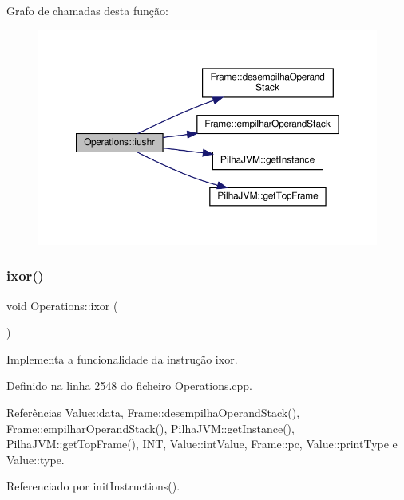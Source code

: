 Grafo de chamadas desta função\+:
\nopagebreak
\begin{figure}[H]
\begin{center}
\leavevmode
\includegraphics[width=350pt]{classOperations_ae3ab5ae36e587a47832886fdf4f8b2a6_cgraph}
\end{center}
\end{figure}
\mbox{\label{classOperations_abd0ce3453623b677de3af1f05bcf4b0b}} 
\subsubsection{\texorpdfstring{ixor()}{ixor()}}
{\footnotesize\ttfamily void Operations\+::ixor (\begin{DoxyParamCaption}{ }\end{DoxyParamCaption})\hspace{0.3cm}{\ttfamily [private]}}



Implementa a funcionalidade da instrução ixor. 



Definido na linha 2548 do ficheiro Operations.\+cpp.



Referências Value\+::data, Frame\+::desempilha\+Operand\+Stack(), Frame\+::empilhar\+Operand\+Stack(), Pilha\+J\+V\+M\+::get\+Instance(), Pilha\+J\+V\+M\+::get\+Top\+Frame(), I\+NT, Value\+::int\+Value, Frame\+::pc, Value\+::print\+Type e Value\+::type.



Referenciado por init\+Instructions().

